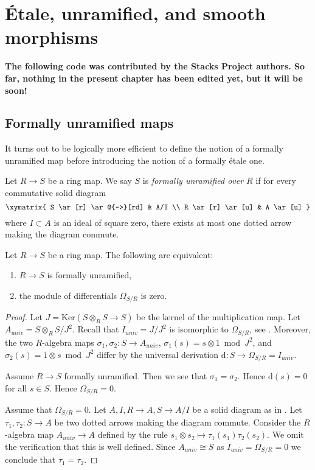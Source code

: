\chapter{\'Etale, unramified, and smooth morphisms}

\textbf{The following code was contributed by the Stacks Project authors. So
far, nothing in the present chapter has been edited yet, but it will be soon!}
\section{Formally unramified maps}
\label{section-formally-unramified}

\noindent
It turns out to be logically more efficient to define
the notion of a formally unramified map before introducing
the notion of a formally \'etale one.

\begin{definition}
\label{definition-formally-unramified}
Let $R \to S$ be a ring map.
We say $S$ is {\it formally unramified over $R$} if for every
commutative solid diagram
$$
\xymatrix{
S \ar[r] \ar@{-->}[rd] & A/I \\
R \ar[r] \ar[u] & A \ar[u]
}
$$
where $I \subset A$ is an ideal of square zero, there exists
at most one dotted arrow making the diagram commute.
\end{definition}

\begin{lemma}
\label{lemma-characterize-formally-unramified}
Let $R \to S$ be a ring map.
The following are equivalent:
\begin{enumerate}
\item $R \to S$ is formally unramified,
\item the module of differentials $\Omega_{S/R}$ is zero.
\end{enumerate}
\end{lemma}

\begin{proof}
Let $J = \text{Ker}(S \otimes_R S \to S)$ be the kernel of
the multiplication map. Let $A_{univ} = S \otimes_R S/J^2$. Recall
that $I_{univ} = J/J^2$ is isomorphic to $\Omega_{S/R}$, see
. Moreover, the two $R$-algebra maps
$\sigma_1, \sigma_2 : S \to A_{univ}$, $\sigma_1(s) = s \otimes 1 \bmod J^2$,
and $\sigma_2(s) = 1 \otimes s \bmod J^2$ differ by the
universal derivation $\text{d} : S \to \Omega_{S/R} = I_{univ}$.

\medskip\noindent
Assume $R \to S$ formally unramified.
Then we see that $\sigma_1 = \sigma_2$.
Hence $\text{d}(s) = 0$ for all $s \in S$.
Hence $\Omega_{S/R} = 0$.

\medskip\noindent
Assume that $\Omega_{S/R} = 0$. Let $A, I, R \to A, S \to A/I$
be a solid diagram as in .
Let $\tau_1, \tau_2 : S \to A$ be two dotted arrows making the
diagram commute. Consider the $R$-algebra map $A_{univ} \to A$
defined by the rule $s_1 \otimes s_2 \mapsto \tau_1(s_1)\tau_2(s_2)$.
We omit the verification that this is well defined. Since $A_{univ} \cong S$
as $I_{univ} = \Omega_{S/R} = 0$ we conclude that $\tau_1 = \tau_2$.
\end{proof}

